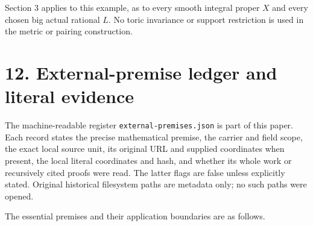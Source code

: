 \documentclass[
  10pt,
]{article}
\begin{document}
Section 3 applies to this example, as to every smooth integral proper
\(X\) and every chosen big actual rational \(L\). No toric invariance or
support restriction is used in the metric or pairing construction.

\section{12. External-premise ledger and literal
evidence}\label{external-premise-ledger-and-literal-evidence}

The machine-readable register \texttt{external-premises.json} is part of
this paper. Each record states the precise mathematical premise, the
carrier and field scope, the exact local source unit, its original URL
and supplied coordinates when present, the local literal coordinates and
hash, and whether its whole work or recursively cited proofs were read.
The latter flags are false unless explicitly stated. Original historical
filesystem paths are metadata only; no such paths were opened.

The essential premises and their application boundaries are as follows.
\end{document}
